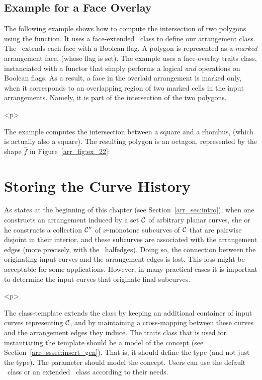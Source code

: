 
\subsection{Example for a Face Overlay}
\label{arr_ssec:face_ovl}
%
The following example shows how to compute the intersection of two polygons
using the  function. It uses a face-extended \dcel\ class
to define our arrangement class. The \dcel\ extends each face with a Boolean 
flag. A polygon is represented as a {\sl marked} arrangement face, (whose
flag is set). The example uses a face-overlay traits class, instanciated with 
a functor that simply performs a logical {\em and} operations on Boolean flags.
As a result, a face in the overlaid arrangement is marked only, when it
corresponds to an overlapping region of two marked cells in the input
arrangements. Namely, it is part of the intersection of the two polygons.

\begin{ccHtmlOnly}<p>\end{ccHtmlOnly}
The example computes the intersection between a square and a rhombus, (which is
actually also a square). The resulting polygon is an octagon, represented 
by the shape $\hat{f}$ in Figure~\ref{arr_fig:ex_22}:


\section{Storing the Curve History}
\label{arr_sec:arr_with_hist}
%
As states at the beginning of this chapter (see Section~\ref{arr_sec:intro}), 
when one constructs an arrangement induced by a set ${\cal C}$ of arbitrary 
planar curves, she or he constructs a collection ${\cal C}''$ of $x$-monotone 
subcurves of ${\cal C}$ that are pairwise disjoint in their interior, and these 
subcurves are associated with the arrangement edges (more precisely, with the 
\dcel\ halfedges). Doing so, the connection between the originating input 
curves and the arrangement edges is lost. This loss might be acceptable for 
some applications. However, in many practical cases it is important to 
determine the input curves that originate final subcurves.

\begin{ccHtmlOnly}<p>\end{ccHtmlOnly}
The  class-template extends
the  class by keeping an additional container of input
curves representing ${\cal C}$, and by maintaining a cross-mapping between these
curves and the arrangement edges they induce. The traits class that is
used for instantiating the template should be a model of the
 concept (see Section~\ref{arr_sssec:insert_gen}).
That is, it should define the  type (and not just the
 type). The  parameter should model the 
 concept. Users can use the default \dcel\ class or 
an extended \dcel\ class according to their needs.

